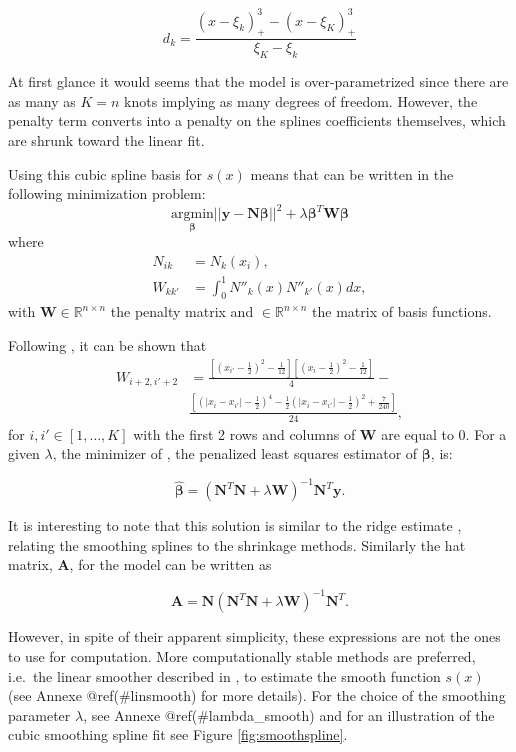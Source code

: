 \documentclass[]{book}
\begin{document}
\[d_k = \frac{(x-\xi_k)^3_+ - (x-\xi_K)^3_+}{\xi_K - \xi_k}\]

At first glance it would seems that the model is over-parametrized since
there are as many as \(K = n\) knots implying as many degrees of freedom.
However, the penalty term converts into a penalty on the splines
coefficients themselves, which are shrunk toward the linear fit.

Using this cubic spline basis for \(s(x)\) means that can be written in
the following minimization problem:
\begin{equation}
\underset{\boldsymbol{\beta}}{\text{argmin}} ||\mathbf{y} - \mathbf{N} \boldsymbol{\beta}||^2 + \lambda \boldsymbol{\beta}^T \mathbf{W} \boldsymbol{\beta}
\label{eq:ridgespline}
\end{equation}
where
\[\begin{aligned}
N_{ik} &= N_k(x_i), \\
W_{kk'} &= \int_0^1 N''_k(x) N''_{k'}(x)dx,\end{aligned}\] with
\(\mathbf{W} \in \mathbb{R}^{n \times n}\) the penalty matrix and
\(\mathbf{} \in \mathbb{R}^{n \times n}\) the matrix of basis functions.

Following \citep{gu_smoothing_2002}, it can be shown that \[\begin{aligned}
W_{i+2,i'+2} & = \frac{\left[\left(x_{i'} - \frac{1}{2}\right)^2 - \frac{1}{12}\right]\left[\left(x_{i}  - \frac{1}{2}\right)^2 - \frac{1}{12}\right]}{4} - \\
& \frac{\left[\left(|x_{i} -x_{i'}| - \frac{1}{2}\right)^4 - \frac{1}{2}\left(|x_{i}-x_{i'} | - \frac{1}{2}\right)^2 + \frac{7}{240}\right]}{24},\end{aligned}\]
for \(i,i' \in [1,\dots,K]\) with the first 2 rows and columns of \(\mathbf{W}\)
are equal to \(0\). For a given \(\lambda\), the minimizer of , the
penalized least squares estimator of \(\boldsymbol{\beta}\), is:

\[\hat{\boldsymbol{\beta}} = (\mathbf{N}^T\mathbf{N} + \lambda\mathbf{W})^{-1}\mathbf{N}^T\mathbf{y}.\]

It is interesting to note that this solution is similar to the ridge
estimate , relating the smoothing splines to the shrinkage methods.
Similarly the hat matrix, \(\mathbf{A}\), for the model can be written as

\[\mathbf{A} = \mathbf{N}(\mathbf{N}^T\mathbf{N} + \lambda\mathbf{W})^{-1}\mathbf{N}^T.\]

However, in spite of their apparent simplicity, these expressions are
not the ones to use for computation. More computationally stable methods
are preferred, i.e.~the linear smoother described in
\citep{buja_linear_1989}, to estimate the smooth function \(s(x)\) (see Annexe
@ref(\#linsmooth) for more details). For the choice of the smoothing
parameter \(\lambda\), see Annexe @ref(\#lambda\_smooth) and for an
illustration of the cubic smoothing spline fit see Figure
\ref{fig:smoothspline}.
\end{document}
